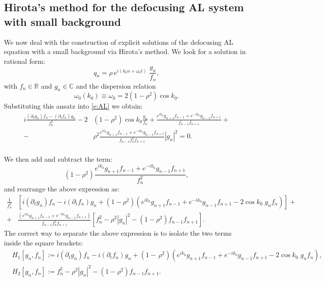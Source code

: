 \documentclass{article}
\def\RR{\mathbb R}
\begin{document}
\subsection{Hirota's method for the defocusing AL system with small background}
We now deal with the construction of explicit solutions of the defocusing AL equation with a small background via Hirota's method. We look for a solution in rational form:
\begin{equation}
    q_n=\rho\,e^{i(k_0 n+\omega_0 t)}\;\frac{g_n}{f_n},
\end{equation}
with $f_n\in\RR$ and $g_n\in\mathbb{C}$ and the dispersion relation 
\begin{equation}
\omega_0(k_0)\equiv\omega_0=2(1-\rho^2)\cos  k_0.
\end{equation}
Substituting this ansatz into \eqref{e:AL} we obtain:
\begin{equation}
\begin{split}
i\frac{(\partial_t g_n)f_n-(\partial_t f_n)g_n}{f_n^2} -2&(1-\rho^2)\cos k_0   \frac{g_n}{f_n}+\frac{e^{ik_0} g_{n+1}f_{n-1}+e^{-ik_0} g_{n-1}f_{n+1} }{f_{n-1}f_{n+1}}+\\[2mm]
-&\rho^2\frac{e^{ik_0} g_{n+1}f_{n-1}+e^{-ik_0} g_{n-1}f_{n+1} }{f_{n-1}f_n^2f_{n+1}}|g_n|^2=0.
\end{split}
\end{equation}\\
We then add and subtract the term:
\begin{equation}
    (1-\rho^2)\frac{e^{ik_0} g_{n+1}f_{n-1}+e^{-ik_0} g_{n-1}f_{n+1} }{f_n^2},
\end{equation}
and rearrange the above expression as:
{\small\begin{equation}
\begin{split}
 \frac{1}{f_n^2}& \left[i(\partial_t g_n)f_n-i(\partial_t f_n)g_n +(1-\rho^2)(e^{ik_0} g_{n+1}f_{n-1}+e^{-ik_0} g_{n-1}f_{n+1} -2\cos k_0  \; g_nf_n) \right]+\\[2mm]
  +&\frac{(e^{ik_0} g_{n+1}f_{n-1}+e^{-ik_0} g_{n-1}f_{n+1})}{f_{n-1}f_n^2f_{n+1}}\left[f_n^2-\rho^2|g_n|^2-(1-\rho^2)f_{n-1}f_{n+1}\right].
  \end{split}
\end{equation}}
The correct way to separate the above expression is to isolate the two terms inside the square brackets:\\
{\small\begin{equation}
\begin{split}
  &  H_1[g_n,f_n]:=i(\partial_t g_n)f_n-i(\partial_t f_n)g_n +(1-\,\rho^2)(e^{ik_0} g_{n+1}f_{n-1}+e^{-ik_0} g_{n-1}f_{n+1} -2\cos k_0  \; g_nf_n), \\[2mm]
   & H_2[g_n,f_n]:=f_n^2-\rho^2|g_n|^2-(1-\rho^2)f_{n-1}f_{n+1}.
   \end{split}
\end{equation}}\\
\end{document}
